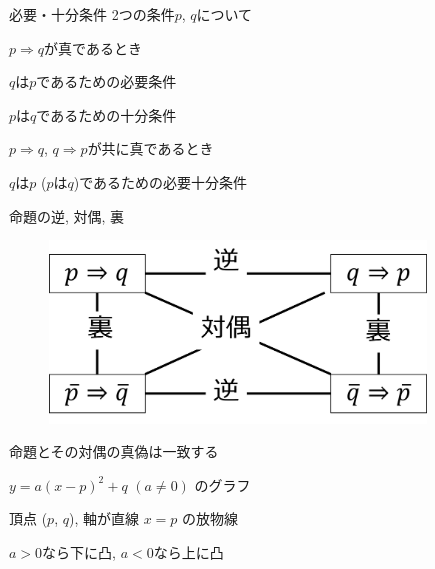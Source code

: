 \documentclass[aspectratio=169, 12pt]{beamer} %
\begin{document}
\begin{frame}{必要・十分条件}
    2つの条件$p$, $q$について \par
    $p \Rightarrow q$が真であるとき \par
    \begin{center}
        $q$は$p$\space であるための必要条件 \par
        $p$は$q$\space であるための十分条件
    \end{center}
    $p \Rightarrow q$, $q \Rightarrow p$が共に真であるとき \par
    \begin{center}
        $q$は$p$ ($p$は$q$)であるための必要十分条件
    \end{center}
\end{frame}
\begin{frame}{命題の逆, 対偶, 裏}
    \begin{figure}[htbp]
        \begin{center}
            \includegraphics[width=100mm]{fig/2.png}
        \end{center}
    \end{figure}
    \begin{center}
        命題とその対偶の真偽は一致する
    \end{center}
\end{frame}

\begin{frame}{$y=a(x-p)^2+q$ $ (a\neq 0)$ のグラフ}
    \begin{center}
        頂点 ($p$, $q$), 軸が直線 $x=p$ の放物線 \par
        $a>0$なら下に凸, $a<0$なら上に凸
    \end{center}
\end{frame}
\end{document}
